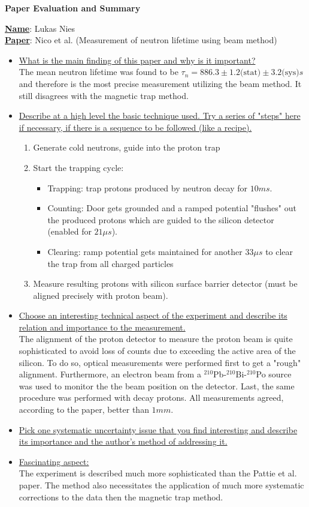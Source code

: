 \documentclass[12pt]{article}
\begin{document}
\noindent
\begin{center}
	\centering
	\Large{\textbf{Paper Evaluation and Summary}}
\end{center}
\textbf{\underline{Name}}: Lukas Nies \\
\noindent
\textbf{\underline{Paper}}: Nico et al. (Measurement of neutron lifetime using beam method) \\[0.5cm]
\noindent
\begin{itemize}
	\item \ul{What is the main finding of this paper and why is it important?} \\
	\noindent
	The mean neutron lifetime was found to be $\tau_n=886.3\pm 1.2\text{(stat)}\pm 3.2\text{(sys)}s$ and therefore is the most precise measurement utilizing the beam method. It still disagrees with the magnetic trap method. 
	\item \ul{Describe at a high level the basic technique used. Try a series of "steps" here if necessary, if there is a sequence to be followed (like a recipe).} \\
	\noindent
	\begin{enumerate}
		\item Generate cold neutrons, guide into the proton trap 
		\item Start the trapping cycle:
		\begin{itemize}
			\item Trapping: trap protons produced by neutron decay for $10ms$.
			\item Counting: Door gets grounded and a ramped potential "flushes" out the produced protons which are guided to the silicon detector (enabled for $21\mu s$).
			\item Clearing: ramp potential gets maintained for another $33\mu s$ to clear the trap from all charged particles
		\end{itemize}
		\item Measure resulting protons with silicon surface barrier detector (must be aligned precisely with proton beam).
	\end{enumerate}
	\item \ul{Choose an interesting technical aspect of the experiment and describe its relation and importance to the measurement.} \\
	\noindent
	The alignment of the proton detector to measure the proton beam is quite sophisticated to avoid loss of counts due to exceeding the active area of the silicon. To do so, optical measurements were performed first to get a "rough" alignment. Furthermore, an electron beam from a $^{210}$Pb-$^{210}$Bi-$^{210}$Po source was used to monitor the the beam position on the detector. Last, the same procedure was performed with decay protons. All measurements agreed, according to the paper, better than $1 mm$.    
	\item \ul{Pick one systematic uncertainty issue that you find interesting and describe  its importance and the author's method of addressing it.}\\
	\noindent
	
	\item \ul{Fascinating aspect:} \\
	\noindent
	The experiment is described much more sophisticated than the Pattie et al. paper. The method also necessitates the application of much more systematic corrections to the data then the magnetic trap method. 
\end{itemize}
\end{document}

